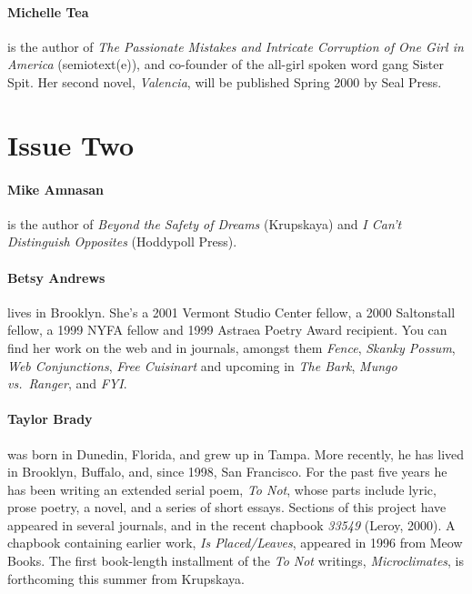 \documentclass[
]{memoir}
\begin{document}
\hypertarget{michelle-tea}{%
\paragraph{Michelle Tea}\label{michelle-tea}}

is the author of \emph{The Passionate Mistakes and Intricate Corruption
of One Girl in America} (semiotext(e)), and co-founder of the all-girl
spoken word gang Sister Spit. Her second novel, \emph{Valencia}, will be
published Spring 2000 by Seal Press.

\hypertarget{issue-two}{%
\section*{Issue Two}\label{issue-two}}

\hypertarget{mike-amnasan}{%
\paragraph{Mike Amnasan}\label{mike-amnasan}}

is the author of \emph{Beyond the Safety of Dreams} (Krupskaya) and
\emph{I Can't Distinguish Opposites} (Hoddypoll Press).

\hypertarget{betsy-andrews}{%
\paragraph{Betsy Andrews}\label{betsy-andrews}}

lives in Brooklyn. She's a 2001 Vermont Studio Center fellow, a 2000
Saltonstall fellow, a 1999 NYFA fellow and 1999 Astraea Poetry Award
recipient. You can find her work on the web and in journals, amongst
them \emph{Fence}, \emph{Skanky Possum}, \emph{Web Conjunctions},
\emph{Free Cuisinart} and upcoming in \emph{The Bark}, \emph{Mungo
vs.~Ranger}, and \emph{FYI}.

\hypertarget{taylor-brady}{%
\paragraph{Taylor Brady}\label{taylor-brady}}

was born in Dunedin, Florida, and grew up in Tampa. More recently, he
has lived in Brooklyn, Buffalo, and, since 1998, San Francisco. For the
past five years he has been writing an extended serial poem, \emph{To
Not}, whose parts include lyric, prose poetry, a novel, and a series of
short essays. Sections of this project have appeared in several
journals, and in the recent chapbook \emph{33549} (Leroy, 2000). A
chapbook containing earlier work, \emph{Is Placed/Leaves}, appeared in
1996 from Meow Books. The first book-length installment of the \emph{To
Not} writings, \emph{Microclimates}, is forthcoming this summer from
Krupskaya.
\end{document}
